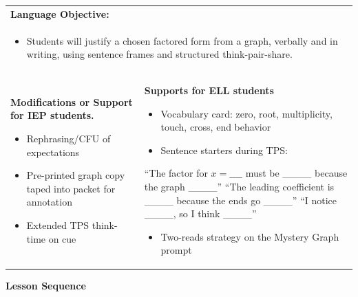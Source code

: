 \documentclass[11pt]{article}
\begin{document}
\noindent
\begin{tabularx}{\textwidth}{|X|X|}
\hline
\multicolumn{2}{|l|}{\textbf{Language Objective:}} \\
\multicolumn{2}{|l|}{
\begin{minipage}{\linewidth}
\begin{itemize}[label=$\bullet$, leftmargin=*]
    \item Students will justify a chosen factored form from a graph, verbally and in writing, using sentence frames and structured think-pair-share.
\end{itemize}
\end{minipage}
} \\
\hline
\textbf{Modifications or Support for IEP students.}
\begin{itemize}[label=$\bullet$, leftmargin=*, nosep]
    \item Rephrasing/CFU of expectations
    \item Pre-printed graph copy taped into packet for annotation
    \item Extended TPS think-time on cue
\end{itemize} &
\textbf{Supports for ELL students}
\begin{itemize}[label=$\bullet$, leftmargin=*, nosep]
    \item Vocabulary card: zero, root, multiplicity, touch, cross, end behavior
    \item Sentence starters during TPS:
\end{itemize}
``The factor for $x=\_\_\_\_$ must be \_\_\_\_ because the graph \_\_\_\_'' \newline
``The leading coefficient is \_\_\_\_ because the ends go \_\_\_\_'' \newline
``I notice \_\_\_\_, so I think \_\_\_\_''
\begin{itemize}[label=$\bullet$, leftmargin=*, nosep]
    \item Two-reads strategy on the Mystery Graph prompt
\end{itemize} \\
\hline
\end{tabularx}

\vspace{1.5em}
\begin{center}
\textbf{Lesson Sequence}
\end{center}
\end{document}
